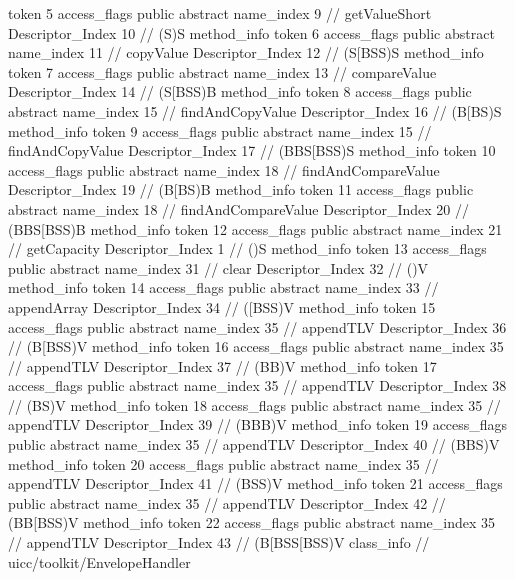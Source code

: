 {{{{{					token	5
					access_flags	public abstract
					name_index	9		// getValueShort
					Descriptor_Index	10		// (S)S
				}
				method_info {
					token	6
					access_flags	public abstract
					name_index	11		// copyValue
					Descriptor_Index	12		// (S[BSS)S
				}
				method_info {
					token	7
					access_flags	public abstract
					name_index	13		// compareValue
					Descriptor_Index	14		// (S[BSS)B
				}
				method_info {
					token	8
					access_flags	public abstract
					name_index	15		// findAndCopyValue
					Descriptor_Index	16		// (B[BS)S
				}
				method_info {
					token	9
					access_flags	public abstract
					name_index	15		// findAndCopyValue
					Descriptor_Index	17		// (BBS[BSS)S
				}
				method_info {
					token	10
					access_flags	public abstract
					name_index	18		// findAndCompareValue
					Descriptor_Index	19		// (B[BS)B
				}
				method_info {
					token	11
					access_flags	public abstract
					name_index	18		// findAndCompareValue
					Descriptor_Index	20		// (BBS[BSS)B
				}
				method_info {
					token	12
					access_flags	public abstract
					name_index	21		// getCapacity
					Descriptor_Index	1		// ()S
				}
				method_info {
					token	13
					access_flags	public abstract
					name_index	31		// clear
					Descriptor_Index	32		// ()V
				}
				method_info {
					token	14
					access_flags	public abstract
					name_index	33		// appendArray
					Descriptor_Index	34		// ([BSS)V
				}
				method_info {
					token	15
					access_flags	public abstract
					name_index	35		// appendTLV
					Descriptor_Index	36		// (B[BSS)V
				}
				method_info {
					token	16
					access_flags	public abstract
					name_index	35		// appendTLV
					Descriptor_Index	37		// (BB)V
				}
				method_info {
					token	17
					access_flags	public abstract
					name_index	35		// appendTLV
					Descriptor_Index	38		// (BS)V
				}
				method_info {
					token	18
					access_flags	public abstract
					name_index	35		// appendTLV
					Descriptor_Index	39		// (BBB)V
				}
				method_info {
					token	19
					access_flags	public abstract
					name_index	35		// appendTLV
					Descriptor_Index	40		// (BBS)V
				}
				method_info {
					token	20
					access_flags	public abstract
					name_index	35		// appendTLV
					Descriptor_Index	41		// (BSS)V
				}
				method_info {
					token	21
					access_flags	public abstract
					name_index	35		// appendTLV
					Descriptor_Index	42		// (BB[BSS)V
				}
				method_info {
					token	22
					access_flags	public abstract
					name_index	35		// appendTLV
					Descriptor_Index	43		// (B[BSS[BSS)V
				}
			}
		}
		class_info {		// uicc/toolkit/EnvelopeHandler
}}}
